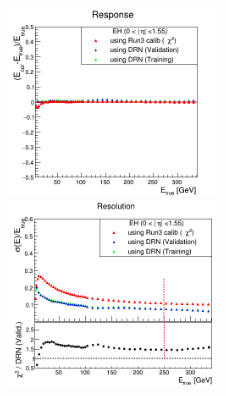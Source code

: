 \begin{figure}
\includegraphics[width=0.495\textwidth]{./plots_pdf/HCAL_plots/Trained_target_ratioflip_0_500_10/pdf/EH_barrel/barrel_corrEtaBarrelEcalHcal.png}
\includegraphics[width=0.495\textwidth]{./plots_pdf/HCAL_plots/Trained_target_ratioflip_0_500_10/pdf/EH_barrel/barrel_corrEtaBarrelEcalHcal_reso.png}


\end{figure}
